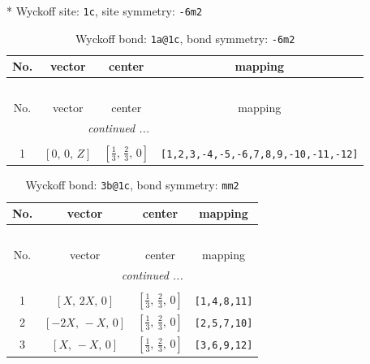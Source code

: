 \documentclass[fleqn,8pt]{jsarticle}
\begin{document}
* Wyckoff site: {\tt 1c}, site symmetry: {\tt -6m2}
\renewcommand{\arraystretch}{1.2}
\begin{longtable}{cccc}
\caption{Wyckoff bond: {\tt 1a@1c}, bond symmetry: {\tt -6m2}}
 \\
 \hline \hline
No. & vector & center & mapping \\ \hline \endfirsthead

\multicolumn{3}{l}{\tablename\ \thetable{}} \\
 \hline \hline
No. & vector & center & mapping \\ \hline \endhead

 \hline \hline
\multicolumn{3}{r}{\footnotesize\it continued ...} \\ \endfoot

 \hline \hline
\multicolumn{3}{r}{} \\ \endlastfoot

1 & $\left[ 0,\, 0,\, Z \right]$ & $\left[ \frac{1}{3},\, \frac{2}{3},\, 0 \right]$ & {\tt [1,2,3,-4,-5,-6,7,8,9,-10,-11,-12]} \\
\end{longtable}
\renewcommand{\arraystretch}{1.2}
\begin{longtable}{cccc}
\caption{Wyckoff bond: {\tt 3b@1c}, bond symmetry: {\tt mm2}}
 \\
 \hline \hline
No. & vector & center & mapping \\ \hline \endfirsthead

\multicolumn{3}{l}{\tablename\ \thetable{}} \\
 \hline \hline
No. & vector & center & mapping \\ \hline \endhead

 \hline \hline
\multicolumn{3}{r}{\footnotesize\it continued ...} \\ \endfoot

 \hline \hline
\multicolumn{3}{r}{} \\ \endlastfoot

1 & $\left[ X,\, 2 X,\, 0 \right]$ & $\left[ \frac{1}{3},\, \frac{2}{3},\, 0 \right]$ & {\tt [1,4,8,11]} \\ \hline
2 & $\left[ - 2 X,\, - X,\, 0 \right]$ & $\left[ \frac{1}{3},\, \frac{2}{3},\, 0 \right]$ & {\tt [2,5,7,10]} \\ \hline
3 & $\left[ X,\, - X,\, 0 \right]$ & $\left[ \frac{1}{3},\, \frac{2}{3},\, 0 \right]$ & {\tt [3,6,9,12]} \\
\end{longtable}
\renewcommand{\arraystretch}{1.2}
\end{document}
